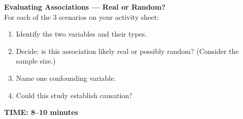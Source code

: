 \documentclass[aspectratio=169, 11pt]{beamer}
\begin{document}
{
\begin{frame}[t, plain]
  \vspace{1.05cm}\par
  \hspace{0.55cm}%
  \begin{minipage}{0.9\textwidth}
    \vspace{1em}
    \small
    \textbf{Evaluating Associations --- Real or Random?}\\[6pt]
    For each of the 3 scenarios on your activity sheet:
    \begin{enumerate}
      \setlength{\itemsep}{0.4em}\setlength{\topsep}{0em}
      \item Identify the two variables and their types.
      \item Decide: is this association likely real or possibly random?
            (Consider the sample size.)
      \item Name one confounding variable.
      \item Could this study establish causation?
    \end{enumerate}
    \vspace{0.6cm}
    {\color{redacc}\bfseries\small TIME: 8--10 minutes}
  \end{minipage}
\end{frame}
}
\end{document}
